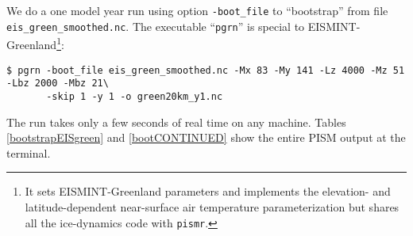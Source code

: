 We do a one model year run using option \texttt{-boot_file} to ``bootstrap'' from file \texttt{eis_green_smoothed.nc}.  The executable ``\texttt{pgrn}'' is special to EISMINT-Greenland\footnote{It sets EISMINT-Greenland parameters and implements the elevation- and latitude-dependent near-surface air temperature parameterization but shares all the ice-dynamics code with \texttt{pismr}.}: 
\begin{verbatim}
$ pgrn -boot_file eis_green_smoothed.nc -Mx 83 -My 141 -Lz 4000 -Mz 51 -Lbz 2000 -Mbz 21\
       -skip 1 -y 1 -o green20km_y1.nc
\end{verbatim}%
\noindent The run takes only a few seconds of real time on any machine.  Tables \ref{bootstrapEISgreen} and \ref{bootCONTINUED} show the entire PISM output at the terminal.

